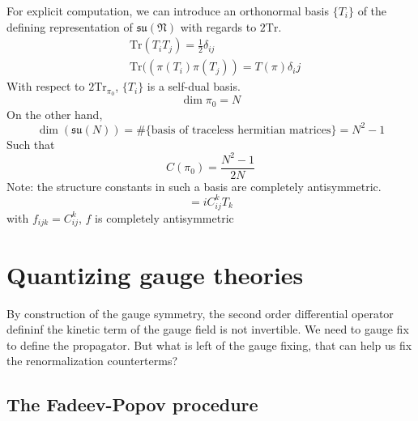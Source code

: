 \documentclass[a4paper]{book}
\theoremstyle{definition}
\theoremstyle{remark}
\begin{document}
For explicit computation, we can introduce an orthonormal basis $\{T_i\}$ of the defining representation of $\mathfrak{su(N)}$ with regards to $2\text{Tr}$. 
\begin{equation}
    \begin{aligned}
        &\text{Tr}(T_iT_j) = \frac{1}{2}\delta_{ij} \\
        &\text{Tr}((\pi(T_i)\pi(T_j)) = T(\pi)\delta_ij
    \end{aligned}
\end{equation}
With respect to $2\text{Tr}_{\pi_0}$, $\{T_i\}$ is a self-dual basis. 
\begin{equation}
    \dim \pi_0 = N 
\end{equation}
On the other hand, 
\begin{equation}
    \dim (\mathfrak{su}(N)) = \#\{\text{basis of traceless hermitian matrices}\} = N^2 - 1
\end{equation}
Such that 
\begin{equation}
    C(\pi_0) = \frac{N^2-1}{2N}
\end{equation}
Note: the structure constants in such a basis are completely antisymmetric. 
\begin{equation}
    [T_i,T_j] = iC_{ij}^kT_k
\end{equation}
with $f_{ijk} = C_{ij}^k$, $f$ is completely antisymmetric

\section{Quantizing gauge theories}

By construction of the gauge symmetry, the second order differential operator defininf the kinetic term of the gauge field is not invertible. We need to gauge fix to define the propagator. But what is left of the gauge fixing, that can help us fix the renormalization counterterms? 

\subsection{The Fadeev-Popov procedure}
\end{document}
